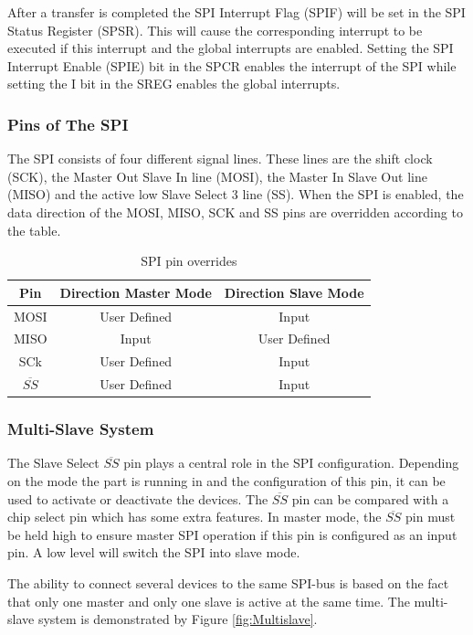 After a transfer is completed the SPI Interrupt Flag (SPIF) will be set in the SPI Status Register (SPSR). This will cause the corresponding interrupt to be executed if this interrupt and the global interrupts are enabled. Setting the SPI Interrupt Enable (SPIE) bit in the SPCR enables the interrupt of the SPI while setting the I bit in the SREG enables the global interrupts.

\subsubsection{Pins of The SPI}
The SPI consists of four different signal lines. These lines are the shift clock (SCK), the Master Out Slave In line (MOSI), the Master In Slave Out line (MISO) and the active low Slave Select 3 line (SS). When the SPI is enabled, the data direction of the MOSI, MISO, SCK and SS pins are overridden according to the table.
\begin{table}[htpb]
\centering
\caption{SPI pin overrides}
\label{tab:Pinoverrides}
\begin{tabular}{|c|c|c|}
\hline 
Pin & Direction Master Mode & Direction Slave Mode \\ 
\hline 
MOSI & User Defined & Input \\ 
\hline 
MISO & Input & User Defined \\ 
\hline 
SCk & User Defined & Input \\ 
\hline 
$\overline{SS}$ & User Defined & Input \\ 
\hline 
\end{tabular} 
\end{table}

\subsubsection{Multi-Slave System}
The Slave Select $\overline{SS}$ pin plays a central role in the SPI configuration. Depending on the mode the part is running in and the configuration of this pin, it can be used to activate or deactivate the devices. The $\overline{SS}$ pin can be compared with a chip select pin which has some extra features. In master mode, the $\overline{SS}$ pin must be held high to ensure master SPI operation if this pin is configured as an input pin. A low level will switch the SPI into slave mode.

The ability to connect several devices to the same SPI-bus is based on the fact that only one master and only one slave is active at the same time. The multi-slave system is demonstrated by Figure \ref{fig:Multislave}.

